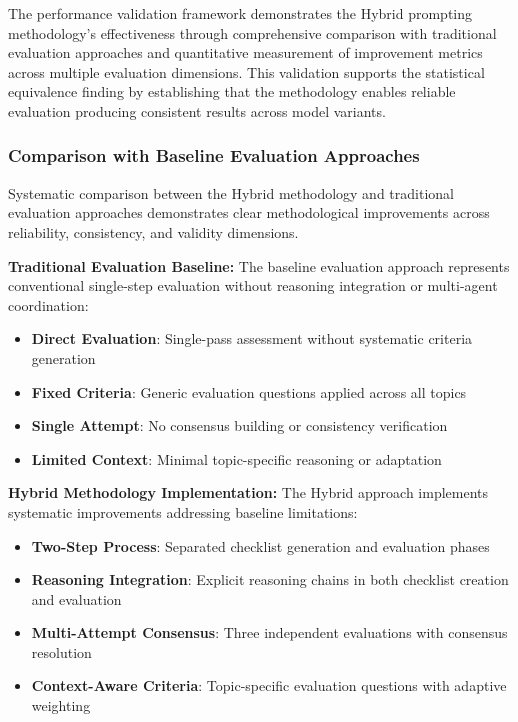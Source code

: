 The performance validation framework demonstrates the Hybrid prompting methodology's effectiveness through comprehensive comparison with traditional evaluation approaches and quantitative measurement of improvement metrics across multiple evaluation dimensions. This validation supports the statistical equivalence finding by establishing that the methodology enables reliable evaluation producing consistent results across model variants.

\subsubsection{Comparison with Baseline Evaluation Approaches}

Systematic comparison between the Hybrid methodology and traditional evaluation approaches demonstrates clear methodological improvements across reliability, consistency, and validity dimensions.

\textbf{Traditional Evaluation Baseline:}
The baseline evaluation approach represents conventional single-step evaluation without reasoning integration or multi-agent coordination:

\begin{itemize}
    \item \textbf{Direct Evaluation}: Single-pass assessment without systematic criteria generation
    \item \textbf{Fixed Criteria}: Generic evaluation questions applied across all topics
    \item \textbf{Single Attempt}: No consensus building or consistency verification
    \item \textbf{Limited Context}: Minimal topic-specific reasoning or adaptation
\end{itemize}

\textbf{Hybrid Methodology Implementation:}
The Hybrid approach implements systematic improvements addressing baseline limitations:

\begin{itemize}
    \item \textbf{Two-Step Process}: Separated checklist generation and evaluation phases
    \item \textbf{Reasoning Integration}: Explicit reasoning chains in both checklist creation and evaluation
    \item \textbf{Multi-Attempt Consensus}: Three independent evaluations with consensus resolution
    \item \textbf{Context-Aware Criteria}: Topic-specific evaluation questions with adaptive weighting
\end{itemize}

